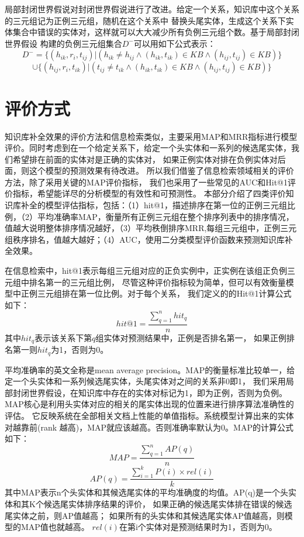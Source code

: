 局部封闭世界假说对封闭世界假说进行了改进。给定一个关系，知识库中这个关系的三元组记为正例三元组，随机在这个关系中
替换头尾实体，生成这个关系下实体集合中错误的实体对，这样就可以大大减少所有负例三元组个数。基于局部封闭世界假设
构建的负例三元组集合$D^-$可以用如下公式表示：
$$D^-=\{(h_{ik},r_i,t_{ij})|(h_{ik} \ne h_{ij} \wedge (h_{ik},t_{ik}) \in KB  \wedge (h_{ij},t_{ij}) \in KB)\}$$
$$ \cup \{(h_{ij},r_i,t_{ik})|(t_{ij} \ne t_{ik} \wedge(h_{ik},t_{ik}) \in KB \wedge(h_{ij},t_{ij}) \in KB)\}$$

\section{评价方式}
\label{sec:metrics}
知识库补全效果的评价方法和信息检索类似，主要采用MAP和MRR\cite{Gardner2014}指标进行模型评价。同时考虑到在一个给定关系下，给定一个头实体和一系列的候选尾实体，我们希望排在前面的实体对是正确的实体对，
如果正例实体对排在负例实体对后面，则这个模型的预测效果有待改进。
所以我们借鉴了信息检索领域相关的评价方法，除了采用关键的MAP评价指标，
我们也采用了一些常见的AUC和Hit@1评价指标，希望能详尽的分析模型的有效性和可预测性。
本部分介绍了四类评价知识库补全的模型评估指标，包括：（1）hit@1，描述排序在第一位的正例三元组比例，（2）平均准确率MAP，衡量所有正例三元组在整个排序列表中的排序情况，值越大说明整体排序情况越好，（3）平均秩倒排序MRR,每组三元组中，正例三元组秩序排名，值越大越好；（4）AUC，使用二分类模型评价函数来预测知识库补全效果。

在信息检索中，hit@1表示每组三元组对应的正负实例中，正实例在该组正负例三元组中排名第一的三元组比例，
尽管这种评价指标较为简单，但可以有效衡量模型中正例三元组排在第一位比例。对于每个关系，
我们定义的的Hit@1计算公式如下：
$$hit@1=\frac{\sum_{q=1}^n{hit_q}}{n}$$
其中$hit_q$表示该关系下第$q$组实体对预测结果中，正例是否排名第一，
如果正例排名第一则$hit_q$为1，否则为0。

平均准确率的英文全称是mean average precision。MAP的衡量标准比较单一，给定一个头实体和一系列候选尾实体，头尾实体对之间的关系非0即1，
我们采用局部封闭世界假设，在知识库中存在的实体对标记为1，即为正例，否则为负例。
MAP核心是利用头实体对应的相关的尾实体出现的位置来进行排序算法准确性的评估。
它反映系统在全部相关文档上性能的单值指标。系统模型计算出来的实体对越靠前(rank 越高)，MAP就应该越高。否则准确率默认为0。MAP的计算公式如下：
$$MAP=\frac{\sum_{q=1}^nAP(q)}{n}$$
$$AP(q)=\frac{\sum_{i=1}^kP(i)\times rel(i)}{k}$$
其中MAP表示n个头实体和其候选尾实体的平均准确度的均值。AP(q)是一个头实体和其K个候选尾实体排序结果的评价，
如果正确的候选尾实体排在错误的候选尾实体之前，则AP值越高；
如果所有的头实体和其候选尾实体AP值越高，则模型的MAP值也就越高。
$rel(i)$在第i个实体对是预测结果时为1，否则为0。


